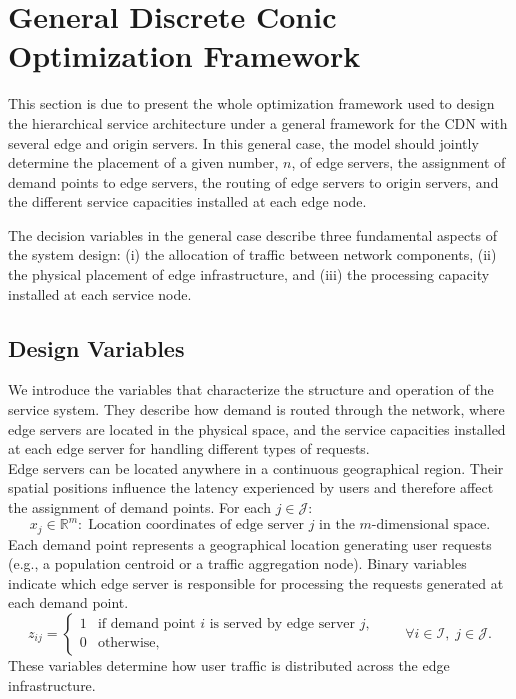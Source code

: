\documentclass[a4paper,11pt,reqno]{amsart}
\newcommand{\I}{\mathcal{I}}
\newcommand{\J}{\mathcal{J}}
\begin{document}
\section{General Discrete Conic Optimization Framework} \label{sec:conicOPT}

This section is due to present the whole optimization framework used to design the hierarchical service architecture under a general framework for the CDN with several edge and origin servers. In this general case, the model should jointly determine the placement of a given number, $n$, of edge servers, the assignment of demand points to edge servers, the routing of edge servers to origin servers, and the different service capacities installed at each edge node. 

The decision variables in the general case describe three fundamental aspects of the system design: 
(i) the allocation of traffic between network components, 
(ii) the physical placement of edge infrastructure, and 
(iii) the processing capacity installed at each service node.

\subsection*{Design Variables}

We introduce the variables that characterize the structure and operation of the service system. They describe how demand is routed through the network, where edge servers are located in the physical space, and the service capacities installed at each edge server for handling different types of requests.\\


 Edge servers can be located anywhere in a continuous geographical region. Their spatial positions influence the latency experienced by users and therefore affect the assignment of demand points. For each $j \in \J$:
$$
x_j \in \mathbb{R}^m: 
\;
\text{Location coordinates of edge server $j$ in the $m$-dimensional space}.
$$
 Each demand point represents a geographical location generating user requests (e.g., a population centroid or a traffic aggregation node). Binary variables indicate which edge server is responsible for processing the requests generated at each demand point.
\begin{equation}\label{eq:z-alloc}
z_{ij} =
\begin{cases}
1 & \text{if demand point $i$ is served by edge server $j$},\\
0 & \text{otherwise},
\end{cases}
\qquad \forall i \in \I,\; j \in \J.
\end{equation}
These variables determine how user traffic is distributed across the edge infrastructure.\\
\end{document}
